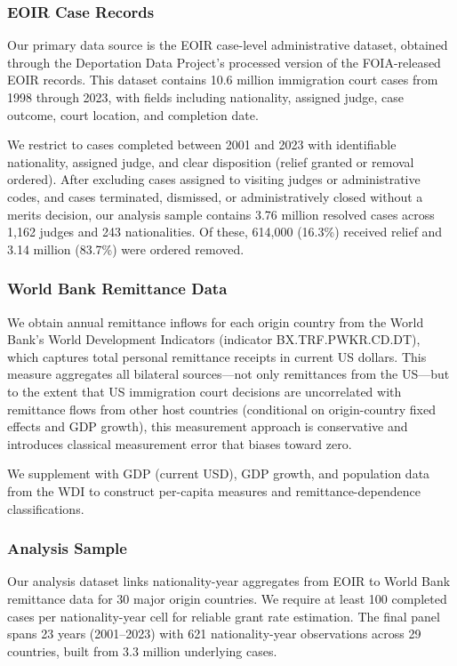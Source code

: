 \documentclass[12pt]{article}
\begin{document}
\subsubsection*{EOIR Case Records} Our primary data source is the EOIR case-level administrative dataset, obtained through the Deportation Data Project's processed version of the FOIA-released EOIR records. This dataset contains 10.6 million immigration court cases from 1998 through 2023, with fields including nationality, assigned judge, case outcome, court location, and completion date.

We restrict to cases completed between 2001 and 2023 with identifiable nationality, assigned judge, and clear disposition (relief granted or removal ordered). After excluding cases assigned to visiting judges or administrative codes, and cases terminated, dismissed, or administratively closed without a merits decision, our analysis sample contains 3.76 million resolved cases across 1,162 judges and 243 nationalities. Of these, 614,000 (16.3\%) received relief and 3.14 million (83.7\%) were ordered removed.

\subsubsection*{World Bank Remittance Data} We obtain annual remittance inflows for each origin country from the World Bank's World Development Indicators (indicator BX.TRF.PWKR.CD.DT), which captures total personal remittance receipts in current US dollars. This measure aggregates all bilateral sources---not only remittances from the US---but to the extent that US immigration court decisions are uncorrelated with remittance flows from other host countries (conditional on origin-country fixed effects and GDP growth), this measurement approach is conservative and introduces classical measurement error that biases toward zero.

We supplement with GDP (current USD), GDP growth, and population data from the WDI to construct per-capita measures and remittance-dependence classifications.

\subsubsection*{Analysis Sample} Our analysis dataset links nationality-year aggregates from EOIR to World Bank remittance data for 30 major origin countries. We require at least 100 completed cases per nationality-year cell for reliable grant rate estimation. The final panel spans 23 years (2001--2023) with 621 nationality-year observations across 29 countries, built from 3.3 million underlying cases.
\end{document}

